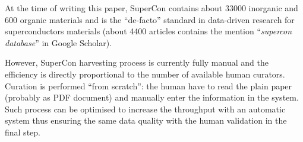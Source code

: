 \documentclass{article}
\begin{document}
At the time of writing this paper, SuperCon contains about 33000 inorganic and 600 organic materials and is the ``de-facto'' standard in data-driven research for superconductors materials  (about 4400 articles contains the mention ``\textit{supercon database}'' in Google Scholar). 



However, SuperCon harvesting process is currently fully manual and the efficiency is directly proportional to the number of available human curators.
Curation is performed ``from scratch'': the human have to read the plain paper (probably as PDF document) and manually enter the information in the system.
Such process can be optimised to increase the throughput with an automatic system thus ensuring the same data quality with the human validation in the final step.
\end{document}
